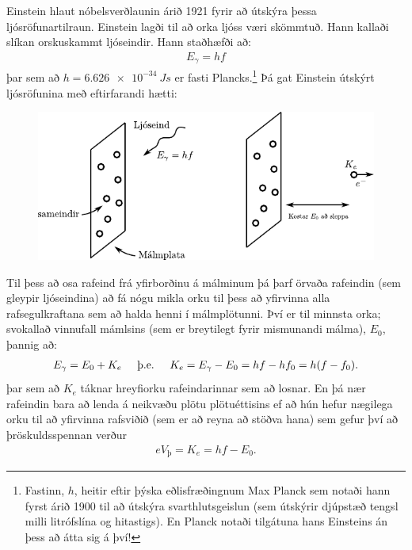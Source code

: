 \ifdefined \wholebook \else\documentclass[oneside]{book}\usepackage{EdlBook}\graphicspath{{figures/}}
\begin{document}
Einstein hlaut nóbelsverðlaunin árið 1921 fyrir að útskýra þessa ljósröfunartilraun. Einstein lagði til að orka ljóss væri skömmtuð. Hann kallaði slíkan orskuskammt ljóseindir. Hann staðhæfði að:
\begin{align*}
    E_\gamma = hf
\end{align*}
þar sem að $h = \SI{6.626e-34}{Js}$ er fasti Plancks.\footnote{Fastinn, $h$, heitir eftir þýska eðlisfræðingnum Max Planck sem notaði hann fyrst árið 1900 til að útskýra svarthlutsgeislun (sem útskýrir djúpstæð tengsl milli litrófslína og hitastigs). En Planck notaði tilgátuna hans Einsteins án þess að átta sig á því!} Þá gat Einstein útskýrt ljósröfunina með eftirfarandi hætti:

\begin{figure}[H]
    \centering
    \includegraphics{figures/einstein-uts.pdf}
\end{figure}

Til þess að osa rafeind frá yfirborðinu á málminum þá þarf örvaða rafeindin (sem gleypir ljóseindina) að fá nógu mikla orku til þess að yfirvinna alla rafsegulkraftana sem að halda henni í málmplötunni. Því er til minnsta orka; svokallað vinnufall mámlsins (sem er breytilegt fyrir mismunandi málma), $E_0$, þannig að:
\begin{align*}
    E_\gamma = E_0 + K_e \hspace{0.5cm} \text{þ.e.} \hspace{0.5cm} K_e = E_\gamma - E_0 = hf - hf_0 = h(f-f_0).
\end{align*}
þar sem að $K_e$ táknar hreyfiorku rafeindarinnar sem að losnar. En þá nær rafeindin bara að lenda á neikvæðu plötu plötuéttisins ef að hún hefur nægilega orku til að yfirvinna rafsviðið (sem er að reyna að stöðva hana) sem gefur því að þröskuldsspennan verður
\begin{align*}
    eV_{\text{þ}} = K_e = hf - E_0.
\end{align*}
\end{document}
